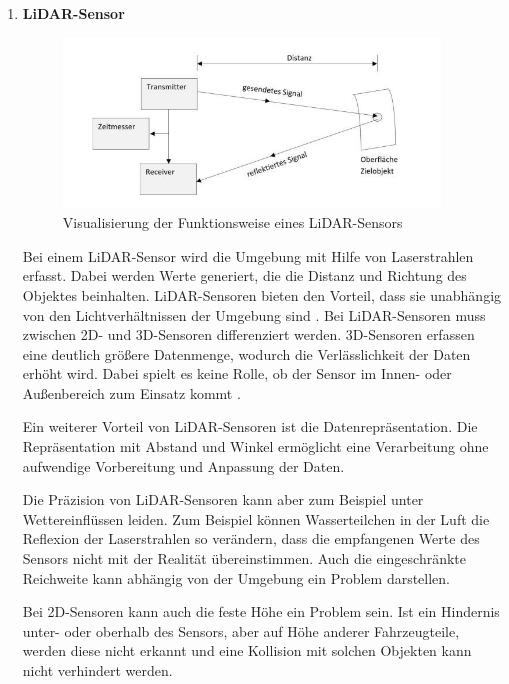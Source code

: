 \begin{enumerate}[leftmargin=*]
    \item \textbf{LiDAR-Sensor} \\
    
    \begin{figure}[H]
        \centering
        \includegraphics[width=10cm]{graphics/funktionLidar.jpg}
        \caption{Visualisierung der Funktionsweise eines LiDAR-Sensors}
        \label{fig:lidarFunction}
    \end{figure}

    Bei einem LiDAR-Sensor wird die Umgebung mit Hilfe von Laserstrahlen erfasst.
    Dabei werden Werte generiert, die die Distanz und Richtung des Objektes beinhalten. 
    LiDAR-Sensoren bieten den Vorteil, dass sie unabhängig von den Lichtverhältnissen der Umgebung sind \cite{lidar}. 
    Bei LiDAR-Sensoren muss zwischen 2D- und 3D-Sensoren differenziert werden. 
    3D-Sensoren erfassen eine deutlich größere Datenmenge, wodurch die Verlässlichkeit der Daten erhöht wird.
    Dabei spielt es keine Rolle, ob der Sensor im Innen- oder Außenbereich zum Einsatz kommt \cite{lidar}. 

    Ein weiterer Vorteil von LiDAR-Sensoren ist die Datenrepräsentation.
    Die Repräsentation mit Abstand und Winkel ermöglicht eine Verarbeitung ohne aufwendige Vorbereitung und Anpassung der Daten.
    
    Die Präzision von LiDAR-Sensoren kann aber zum Beispiel unter Wettereinflüssen leiden. 
    Zum Beispiel können Wasserteilchen in der Luft die Reflexion der Laserstrahlen so verändern, dass die empfangenen Werte des Sensors nicht mit der Realität übereinstimmen.
    Auch die eingeschränkte Reichweite kann abhängig von der Umgebung ein Problem darstellen.

    Bei 2D-Sensoren kann auch die feste Höhe ein Problem sein.
    Ist ein Hindernis unter- oder oberhalb des Sensors, aber auf Höhe anderer Fahrzeugteile, 
    werden diese nicht erkannt und eine Kollision mit solchen Objekten kann nicht verhindert werden. 


\end{enumerate}
